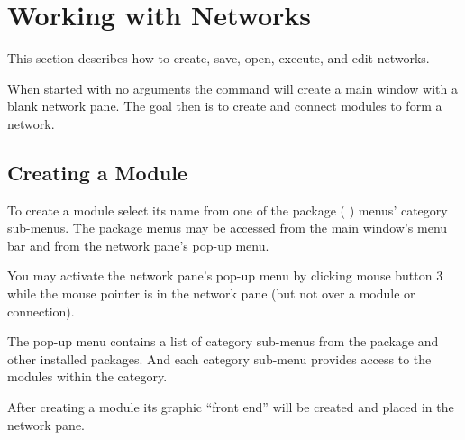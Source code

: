 %

  \newcommand{\modgraphic}%
  {\centerline{\epsfig{file=figures/modgraphic-1.eps.gz,width=4in,
        bbllx=18, bblly=18, bburx=594, bbury=355}}}
\begin{htmlonly}
  \newcommand{\modgraphic}{%
  \htmladdimg[align=top,width="256",alt="SCIRun Module Graphic"]
  {../figures/modgraphic-1.gif}}
\end{htmlonly}

  \newcommand{\moddialog}%
  {\centerline{\epsfig{file=figures/moddialog.eps.gz,
        bbllx=0, bblly=0, bburx=201, bbury=282}}}
\begin{htmlonly}
  \newcommand{\moddialog}{%
  \htmladdimg[align=top,alt="SCIRun Module Dialog"]
  {../figures/moddialog.jpg}}
\end{htmlonly}

\section{Working with Networks}
\label{sec:workwithnets}

This section describes how to create, save, open, execute, and edit
networks.

When started with no arguments the  command will create a
main window with a blank network pane.  The goal then is to create and
connect modules to form a network.


\subsection{Creating a Module}
\label{sec:creatingmodules}

To create a module select its name from one of the package (\eg{} \sr)
menus' category sub-menus.  The package menus may be accessed from the main
window's menu bar and from the network pane's pop-up menu.

You may activate the network pane's pop-up menu by clicking mouse button 3
while the mouse pointer is in the network pane (but not over a module or
connection).  

The pop-up menu contains a list of category sub-menus from the \sr{} package
and other installed packages.  And each category sub-menu provides
access to the modules within the category.

After creating a module its graphic ``front end'' will be created and
placed in the network pane.

